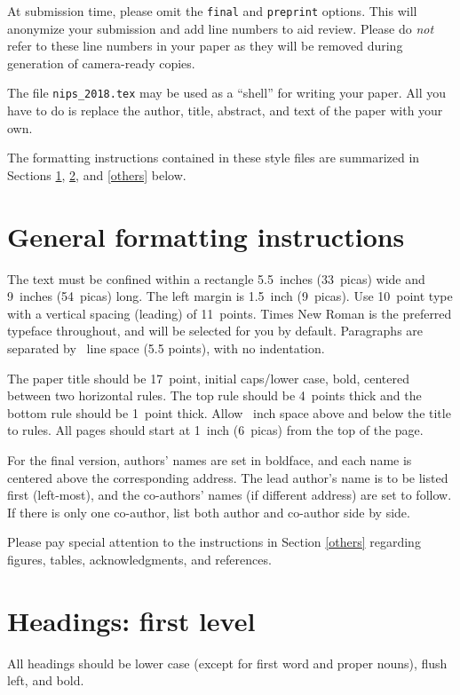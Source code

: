 \documentclass{article}
\begin{document}
At submission time, please omit the \verb+final+ and \verb+preprint+
options. This will anonymize your submission and add line numbers to aid
review. Please do \emph{not} refer to these line numbers in your paper
as they will be removed during generation of camera-ready copies.

The file \verb+nips_2018.tex+ may be used as a ``shell'' for writing
your paper. All you have to do is replace the author, title, abstract,
and text of the paper with your own.

The formatting instructions contained in these style files are
summarized in Sections \ref{gen_inst}, \ref{headings}, and
\ref{others} below.

\section{General formatting instructions}
\label{gen_inst}

The text must be confined within a rectangle 5.5~inches (33~picas)
wide and 9~inches (54~picas) long. The left margin is 1.5~inch
(9~picas).  Use 10~point type with a vertical spacing (leading) of
11~points.  Times New Roman is the preferred typeface throughout, and
will be selected for you by default.  Paragraphs are separated by
~line space (5.5 points), with no indentation.

The paper title should be 17~point, initial caps/lower case, bold,
centered between two horizontal rules. The top rule should be 4~points
thick and the bottom rule should be 1~point thick. Allow
~inch space above and below the title to rules. All
pages should start at 1~inch (6~picas) from the top of the page.

For the final version, authors' names are set in boldface, and each
name is centered above the corresponding address. The lead author's
name is to be listed first (left-most), and the co-authors' names (if
different address) are set to follow. If there is only one co-author,
list both author and co-author side by side.

Please pay special attention to the instructions in Section \ref{others}
regarding figures, tables, acknowledgments, and references.


\section{Headings: first level}
\label{headings}

All headings should be lower case (except for first word and proper
nouns), flush left, and bold.
\end{document}
